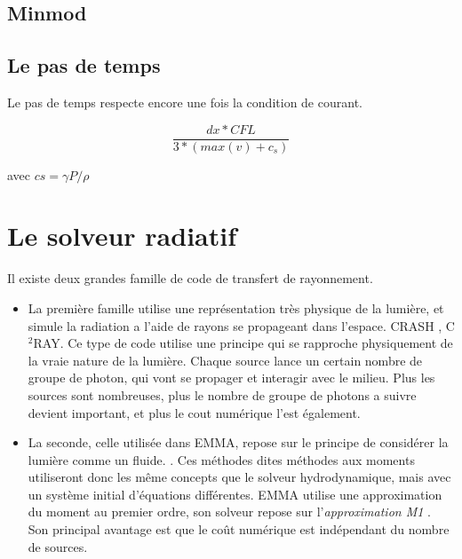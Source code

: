 \subsection{Minmod}



\subsection{Le pas de temps}

Le pas de temps respecte encore une fois la condition de courant.

\begin{equation}
\frac{dx * CFL }{3*(max(v) + c_s)}
\end{equation}

avec $cs = \gamma P/\rho$

\section{Le solveur radiatif}
\label{sec:rad_solver}

Il existe deux grandes famille de code de transfert de rayonnement.
\begin{itemize}
\item La première famille utilise une représentation très physique de la lumière, et simule la radiation a l'aide de rayons se propageant dans l'espace.
CRASH \citep{2003MNRAS.345..379M}, C$^2$RAY\citep{2006NewA...11..374M}.
Ce type de code utilise une principe qui se rapproche physiquement de la vraie nature de la lumière.
Chaque source lance un certain nombre de groupe de photon, qui vont se propager et interagir avec le milieu.
Plus les sources sont nombreuses, plus le nombre de groupe de photons a suivre devient important, et plus le cout numérique l'est également.

\item La seconde, celle utilisée dans EMMA, repose sur le principe de considérer la lumière comme un fluide. \citep{gnedin_multi-dimensional_2001, aubert_radiative_2008}.
Ces méthodes dites méthodes aux moments utiliseront donc les même concepts que le solveur hydrodynamique, mais avec un système initial d'équations différentes. 
EMMA utilise une approximation du moment au premier ordre, son solveur repose sur l'\textit{approximation M1} \citep{levermore_relating_1984}.
Son principal avantage est que le coût numérique est indépendant du nombre de sources.
\end{itemize}

